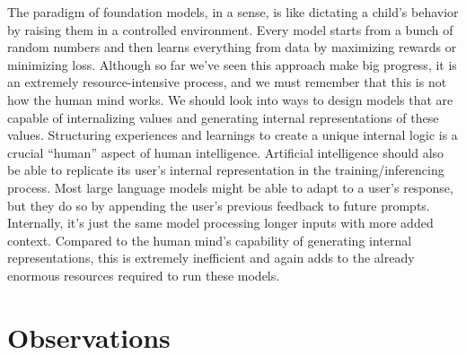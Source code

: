 \documentclass[12pt]{article}
\begin{document}
The paradigm of foundation models, in a sense, is like dictating a child's behavior by raising them in a controlled environment. Every model starts from a bunch of random numbers and then learns everything from data by maximizing rewards or minimizing loss. Although so far we've seen this approach make big progress, it is an extremely resource-intensive process, and we must remember that this is not how the human mind works. We should look into ways to design models that are capable of internalizing values and generating internal representations of these values. Structuring experiences and learnings to create a unique internal logic is a crucial ``human'' aspect of human intelligence. Artificial intelligence should also be able to replicate its user's internal representation in the training/inferencing process. Most large language models might be able to adapt to a user's response, but they do so by appending the user's previous feedback to future prompts. Internally, it's just the same model processing longer inputs with more added context. Compared to the human mind's capability of generating internal representations, this is extremely inefficient and again adds to the already enormous resources required to run these models.


\section{Observations} \label{philosophy}
\end{document}
